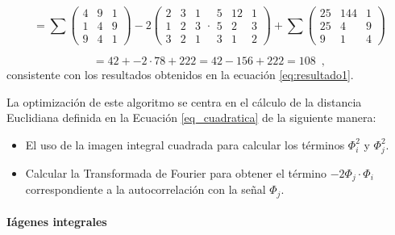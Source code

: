 \begin{equation}
=\sum\left(\begin{array}{ccc}
4 & 9 & 1\\
1 & 4 & 9\\
9 & 4 & 1
\end{array}\right)-2\left(\begin{array}{ccc}
2 & 3 & 1\\
1 & 2 & 3\\
3 & 2 & 1
\end{array}\cdot\begin{array}{ccc}
5 & 12 & 1\\
5 & 2 & 3\\
3 & 1 & 2
\end{array}\right)
+\sum\left(\begin{array}{ccc}
25 & 144 & 1\\
25 & 4 & 9\\
9 & 1 & 4
\end{array}\right)
\end{equation}



\begin{equation}
=42+-2\cdot78+222=42-156+222=108\label{eq:cuadrados-1} \enspace ,
\end{equation}
consistente con los resultados obtenidos en la ecuaci\'on \ref{eq:resultado1}.




La optimizaci\'on de este algoritmo se centra en el c\'alculo de la distancia Euclidiana definida en la Ecuaci\'on \ref{eq_cuadratica} de la siguiente manera:
\begin{itemize}
\item El uso de la imagen integral cuadrada para calcular los t\'erminos $\varPhi_{i}^{2}$
y $\varPhi_{j}^{2}$.
\item Calcular la Transformada de Fourier para obtener el t\'ermino $-2\varPhi_{j}\cdot\varPhi_{i}$
correspondiente a la autocorrelaci\'on con la se\~nal
$\varPhi_{j}$.
\end{itemize}
 
\paragraph{I\'agenes integrales}


